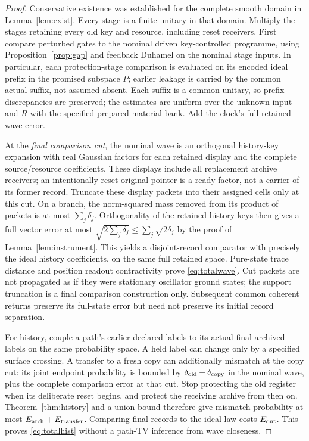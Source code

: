 \documentclass[11pt]{article}
\theoremstyle{definition}\newtheorem{assumption}[theorem]{Constitutive assumption}
\theoremstyle{remark}\newtheorem{remark}[theorem]{Remark}
\begin{document}
\begin{proof}
Conservative existence was established for the complete smooth domain in Lemma~\ref{lem:exist}. Every stage is a finite unitary in that domain. Multiply the stages retaining every old key and resource, including reset receivers. First compare perturbed gates to the nominal driven key-controlled programme, using Proposition~\ref{prop:gap} and feedback Duhamel on the nominal stage inputs. In particular, each protection-stage comparison is evaluated on its encoded ideal prefix in the promised subspace $P$; earlier leakage is carried by the common actual suffix, not assumed absent. Each suffix is a common unitary, so prefix discrepancies are preserved; the estimates are uniform over the unknown input and $R$ with the specified prepared material bank. Add the clock's full retained-wave error.

At the \emph{final comparison cut}, the nominal wave is an orthogonal history-key expansion with real Gaussian factors for each retained display and the complete source/resource coefficients. These displays include all replacement archive receivers; an intentionally reset original pointer is a ready factor, not a carrier of its former record. Truncate these display packets into their assigned cells only at this cut. On a branch, the norm-squared mass removed from its product of packets is at most $\sum_j\delta_j$. Orthogonality of the retained history keys then gives a full vector error at most $\sqrt{2\sum_j\delta_j}\le\sum_j\sqrt{2\delta_j}$ by the proof of Lemma~\ref{lem:instrument}. This yields a disjoint-record comparator with precisely the ideal history coefficients, on the same full retained space. Pure-state trace distance and position readout contractivity prove \eqref{eq:totalwave}. Cut packets are not propagated as if they were stationary oscillator ground states; the support truncation is a final comparison construction only. Subsequent common coherent returns preserve its full-state error but need not preserve its initial record separation.

For history, couple a path's earlier declared labels to its actual final archived labels on the same probability space. A held label can change only by a specified surface crossing. A transfer to a fresh copy can additionally mismatch at the copy cut: its joint endpoint probability is bounded by $\delta_{\rm old}+\delta_{\rm copy}$ in the nominal wave, plus the complete comparison error at that cut. Stop protecting the old register when its deliberate reset begins, and protect the receiving archive from then on. Theorem~\ref{thm:history} and a union bound therefore give mismatch probability at most $E_{\rm arch}+E_{\rm transfer}$. Comparing final records to the ideal law costs $E_{\rm out}$. This proves \eqref{eq:totalhist} without a path-TV inference from wave closeness.


\end{proof}
\end{document}
